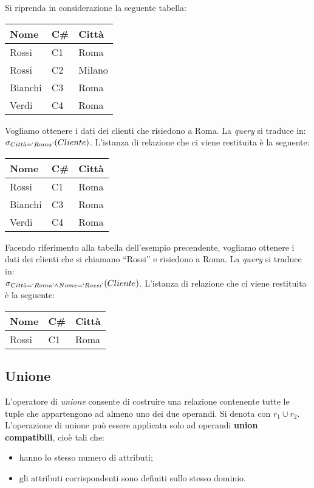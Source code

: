 \begin{exmp}
 Si riprenda in considerazione la seguente tabella:
 \begin{center}
\begin{tabular}{l |l | l}
  Nome & C\# & Città\\
  \hline
  Rossi & C1 & Roma\\
  Rossi & C2 & Milano\\
  Bianchi & C3 & Roma\\
  Verdi & C4 & Roma\\
\end{tabular}
\end{center}
Vogliamo ottenere i dati dei clienti che risiedono a Roma. La \emph{query}
si traduce in:\\$\sigma_{Citt\grave{a}=`Roma\text{'}}(Cliente)$. L'istanza di relazione che ci 
viene restituita è la seguente:
 \begin{center}
\begin{tabular}{l |l | l}
  Nome & C\# & Città\\
  \hline
  Rossi & C1 & Roma\\
  Bianchi & C3 & Roma\\
  Verdi & C4 & Roma\\
\end{tabular}
\end{center}
\end{exmp}
\begin{exmp}
Facendo riferimento alla tabella dell'esempio precendente, vogliamo ottenere i dati dei  
clienti che si chiamano ``Rossi'' e risiedono a Roma. La \emph{query}
si traduce in: \\$\sigma_{Citt\grave{a}=`Roma\text{'}\wedge Nome=`Rossi\text{'}}(Cliente)$. L'istanza 
di relazione che ci viene restituita è la seguente:
\begin{center}
\begin{tabular}{l |l | l}
  Nome & C\# & Città\\
  \hline
  Rossi & C1 & Roma\\
 \end{tabular}
 \end{center}
\end{exmp}

\subsection{Unione}
L'operatore di \emph{unione} consente di costruire una relazione contenente tutte
le tuple che appartengono ad almeno uno dei due operandi. Si denota con $r_1 \cup r_2$.
L'operazione di unione può essere applicata solo ad operandi \textbf{union compatibili},
cioè tali che:
\begin{itemize}
 \item hanno lo stesso numero di attributi;
 \item gli attributi corrispondenti sono definiti sullo stesso dominio.
\end{itemize}

